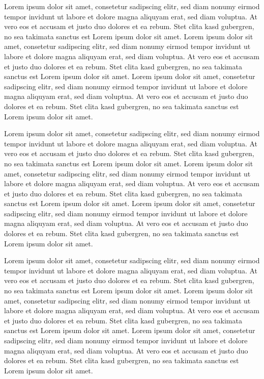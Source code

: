 \documentclass[german]{uebung}
\begin{document}
\begin{exercise}{1}
	Lorem ipsum dolor sit amet, consetetur sadipscing elitr, sed diam nonumy eirmod 
	tempor invidunt ut labore et dolore magna aliquyam erat, sed diam voluptua. At 
	vero eos et accusam et justo duo dolores et ea rebum. Stet clita kasd gubergren, 
	no sea takimata sanctus est Lorem ipsum dolor sit amet. Lorem ipsum dolor sit 
	amet, consetetur sadipscing elitr, sed diam nonumy eirmod tempor invidunt ut 
	labore et dolore magna aliquyam erat, sed diam voluptua. At vero eos et accusam 
	et justo duo dolores et ea rebum. Stet clita kasd gubergren, no sea takimata 
	sanctus est Lorem ipsum dolor sit amet. Lorem ipsum dolor sit amet, consetetur 
	sadipscing elitr, sed diam nonumy eirmod tempor invidunt ut labore et dolore 
	magna aliquyam erat, sed diam voluptua. At vero eos et accusam et justo duo 
	dolores et ea rebum. Stet clita kasd gubergren, no sea takimata sanctus est 
	Lorem ipsum dolor sit amet. 
	
	Lorem ipsum dolor sit amet, consetetur sadipscing elitr, sed diam nonumy eirmod 
	tempor invidunt ut labore et dolore magna aliquyam erat, sed diam voluptua. At 
	vero eos et accusam et justo duo dolores et ea rebum. Stet clita kasd gubergren, 
	no sea takimata sanctus est Lorem ipsum dolor sit amet. Lorem ipsum dolor sit 
	amet, consetetur sadipscing elitr, sed diam nonumy eirmod tempor invidunt ut 
	labore et dolore magna aliquyam erat, sed diam voluptua. At vero eos et accusam 
	et justo duo dolores et ea rebum. Stet clita kasd gubergren, no sea takimata 
	sanctus est Lorem ipsum dolor sit amet. Lorem ipsum dolor sit amet, consetetur 
	sadipscing elitr, sed diam nonumy eirmod tempor invidunt ut labore et dolore 
	magna aliquyam erat, sed diam voluptua. At vero eos et accusam et justo duo 
	dolores et ea rebum. Stet clita kasd gubergren, no sea takimata sanctus est 
	Lorem ipsum dolor sit amet. 
	
	Lorem ipsum dolor sit amet, consetetur sadipscing elitr, sed diam nonumy eirmod 
	tempor invidunt ut labore et dolore magna aliquyam erat, sed diam voluptua. At 
	vero eos et accusam et justo duo dolores et ea rebum. Stet clita kasd gubergren, 
	no sea takimata sanctus est Lorem ipsum dolor sit amet. Lorem ipsum dolor sit 
	amet, consetetur sadipscing elitr, sed diam nonumy eirmod tempor invidunt ut 
	labore et dolore magna aliquyam erat, sed diam voluptua. At vero eos et accusam 
	et justo duo dolores et ea rebum. Stet clita kasd gubergren, no sea takimata 
	sanctus est Lorem ipsum dolor sit amet. Lorem ipsum dolor sit amet, consetetur 
	sadipscing elitr, sed diam nonumy eirmod tempor invidunt ut labore et dolore 
	magna aliquyam erat, sed diam voluptua. At vero eos et accusam et justo duo 
	dolores et ea rebum. Stet clita kasd gubergren, no sea takimata sanctus est 
	Lorem ipsum dolor sit amet. 
\end{exercise}
\end{document}
